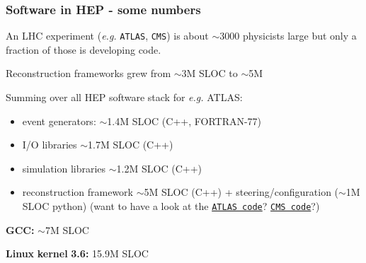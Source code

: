 \documentclass[9pt]{beamer}
\newcommand{\myblue} [1] {{\color{blue}#1}}
\begin{document}
\begin{frame}[fragile]
\frametitle{Software in HEP - some numbers}

	\begin{exampleblock}{}
		An LHC experiment (\emph{e.g.} \texttt{ATLAS}, \texttt{CMS}) is about $\sim$3000 physicists large but only a fraction of those is developing code.


Reconstruction frameworks grew from $\sim$3M SLOC to $\sim$5M
	\end{exampleblock}{}

	\begin{block}{}
Summing over all HEP software stack for \emph{e.g.} ATLAS:


\begin{itemize}
\item event generators: $\sim$1.4M SLOC (C++, FORTRAN-77)
\item I/O libraries $\sim$1.7M SLOC (C++)
\item simulation libraries $\sim$1.2M SLOC (C++)
\item reconstruction framework $\sim$5M SLOC (C++) + steering/configuration ($\sim$1M SLOC python) (want to have a look at the \myblue{\href{http://acode-browser.usatlas.bnl.gov/lxr/source/}{\texttt{ATLAS code}}}? \myblue{\href{https://github.com/cms-sw/cmssw}{\texttt{CMS code}}}?)
\end{itemize}
	\end{block}{}

\textbf{GCC:} $\sim$7M SLOC


\textbf{Linux} \textbf{kernel} \textbf{3.6:} 15.9M SLOC



\end{frame}
\end{document}
